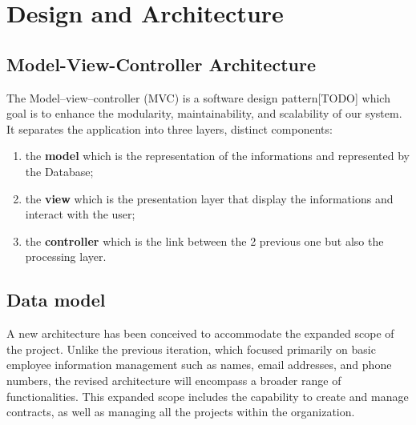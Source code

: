 \section{Design and Architecture}


\subsection{Model-View-Controller Architecture}

The Model–view–controller (MVC) is a software design pattern[TODO] which goal is to enhance the modularity, maintainability, and scalability of our system. It separates the application into three layers, distinct components:

\begin{enumerate}
	\item the \textbf{model} which is the representation of the informations and represented by the Database;
	\item the \textbf{view} which is the presentation layer that display the informations and interact with the user;
	\item the \textbf{controller} which is the link between the 2 previous one but also the processing layer.
\end{enumerate}


\subsection{Data model}

A new architecture has been conceived to accommodate the expanded scope of the project. Unlike the previous iteration, which focused primarily on basic employee information management such as names, email addresses, and phone numbers, the revised architecture will encompass a broader range of functionalities. This expanded scope includes the capability to create and manage contracts, as well as managing all the projects within the organization.




